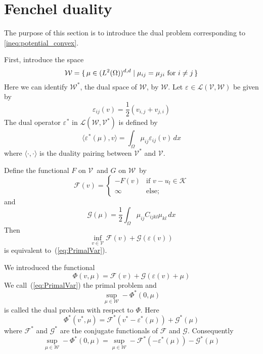 \documentclass[12pt,a4paper]{article}
\numberwithin{equation}{section}
\numberwithin{table}{section}
\numberwithin{figure}{section}
\newcommand{\W}{\ensuremath{\mathcal{W}}}
\newcommand{\half}{\ensuremath{\frac{1}{2}}}
\newcommand{\V}{\ensuremath{\mathcal{V}}}
\newcommand{\K}{\ensuremath{\mathcal{K}}}
\renewcommand{\L}{{\mathcal L}}
\newcommand{\F}{\ensuremath{{\mathcal F}}}
\newcommand{\G}{\ensuremath{{\mathcal G}}}
\newcommand{\intO}{\int_\Omega\!\!}
\renewcommand{\epsilon}{\varepsilon}
\newcommand{\strain}[1][]{\ensuremath{\epsilon_{#1}}}
\newcommand{\epsij}{\strain[ij]}
\providecommand{\dualp}[2]{\langle #1, #2 \rangle}
\newcommand{\infvinV}{\ensuremath{\inf_{v\in \V}}}
\newcommand{\dx}{{\,dx}}
\begin{document}
\section{Fenchel duality}

The purpose of this section is to introduce the dual problem corresponding to \eqref{ineq:potential_convex}.

First, introduce the space
\begin{equation}
  \W = \set{\mu \in (L^2(\Omega))^{d,d} | \mu_{ij} = \mu_{ji}
    \text{ for } i\ne j } 
\end{equation}
Here we can identify $\W^*$, the dual space of $\W$, by $\W$.  Let $\strain \in \L(\V,\W)$
be given by
\begin{equation}
  \epsij(v) = \half (v_{i,j} + v_{j,i})
\end{equation}
The dual operator
$\strain^*$ in $\L(\W,\V^*)$ is defined by
\begin{equation}
  \dualp{\strain^*(\mu)}{v} = \intO \mu_{ij} \epsij(v) \dx
\end{equation}
where $\dualp{\cdot}{\cdot}$ is the duality pairing between $\V^*$ and
$\V$.  

Define the functional $F$ on \V\ and $G$ on \W\ by
\begin{equation}
  \F(v) =
  \begin{cases}
    -F(v) & \text{if } v-u_l \in \K \\
    \infty & \text{else;}
  \end{cases}
\end{equation}
and
\begin{equation}
  \G(\mu) = \half \intO \mu_{ij} C_{ijkl} \mu_{kl} \dx
\end{equation}
Then
\begin{equation}
  \infvinV \F(v) + \G(\strain(v))
\end{equation}
is equivalent to~(\ref{eq:PrimalVar}).

We introduced the functional
\begin{equation}
\varPhi(v,\mu) = \F(v) + \G(\epsilon(v) + \mu)
\end{equation}
We call~(\ref{eq:PrimalVar}) the primal problem and
\begin{equation}
  \sup_{\mu\in \W} -\varPhi^*(0,\mu)
\end{equation}
is called the dual problem with respect to $\varPhi$.  Here
\begin{equation}
  \varPhi^*(v^*,\mu) = \F^*(v^*-\epsilon^*(\mu)) + \G^*(\mu)
\end{equation}
where $\F^*$ and $\G^*$ are the conjugate functionals of $\F$ and $\G$.  Consequently
\begin{equation}
  \sup_{\mu\in \W} -\varPhi^*(0,\mu)
  = \sup_{\mu\in \W} -\F^*(-\epsilon^*(\mu)) - \G^*(\mu)
\end{equation}
\end{document}
